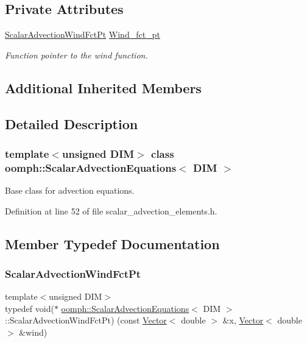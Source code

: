 \subsection*{Private Attributes}
\begin{DoxyCompactItemize}
\item 
\hyperlink{classoomph_1_1ScalarAdvectionEquations_af80d315e76fe7392744d5442f1d2386d}{Scalar\+Advection\+Wind\+Fct\+Pt} \hyperlink{classoomph_1_1ScalarAdvectionEquations_a6c98466fe7083d8d7542c35d23c918c1}{Wind\+\_\+fct\+\_\+pt}
\begin{DoxyCompactList}\small\item\em Function pointer to the wind function. \end{DoxyCompactList}\end{DoxyCompactItemize}
\subsection*{Additional Inherited Members}


\subsection{Detailed Description}
\subsubsection*{template$<$unsigned D\+IM$>$\newline
class oomph\+::\+Scalar\+Advection\+Equations$<$ D\+I\+M $>$}

Base class for advection equations. 

Definition at line 52 of file scalar\+\_\+advection\+\_\+elements.\+h.



\subsection{Member Typedef Documentation}
\mbox{\label{classoomph_1_1ScalarAdvectionEquations_af80d315e76fe7392744d5442f1d2386d}} 
\subsubsection{\texorpdfstring{Scalar\+Advection\+Wind\+Fct\+Pt}{ScalarAdvectionWindFctPt}}
{\footnotesize\ttfamily template$<$unsigned D\+IM$>$ \\
typedef void($\ast$ \hyperlink{classoomph_1_1ScalarAdvectionEquations}{oomph\+::\+Scalar\+Advection\+Equations}$<$ D\+IM $>$\+::Scalar\+Advection\+Wind\+Fct\+Pt) (const \hyperlink{classoomph_1_1Vector}{Vector}$<$ double $>$ \&x, \hyperlink{classoomph_1_1Vector}{Vector}$<$ double $>$ \&wind)\hspace{0.3cm}{\ttfamily [private]}}



